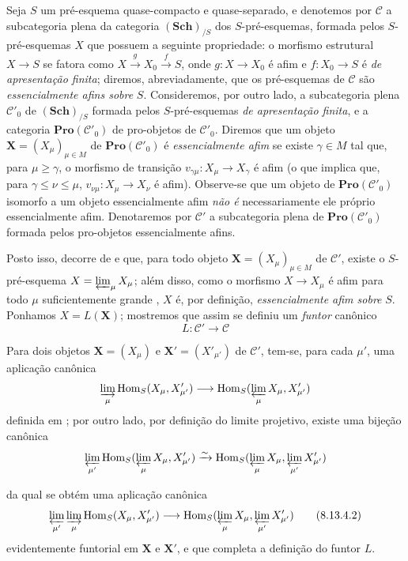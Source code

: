 \begin{env}[8.13.4]
\label{IV.8.13.4}
Seja $S$ um pré-esquema quase-compacto e quase-separado, e denotemos por $\mathcal{C}$ a subcategoria plena da categoria $(\mathbf{Sch})_{/S}$ dos $S$-pré-esquemas, formada pelos $S$-pré-esquemas $X$ que possuem a seguinte propriedade: o morfismo estrutural $X\to S$ se fatora como $X\xrightarrow{g}X_0\xrightarrow{f}S$, onde $g:X\to X_0$ é afim e $f:X_0\to S$ é \emph{de apresentação finita}; diremos, abreviadamente, que os pré-esquemas de $\mathcal{C}$ são \emph{essencialmente afins sobre} $S$.
Consideremos, por outro lado, a subcategoria plena $\mathcal{C}'_0$ de $(\mathbf{Sch})_{/S}$ formada pelos $S$-pré-esquemas \emph{de apresentação finita}, e a categoria $\mathbf{Pro}(\mathcal{C}'_0)$ de pro-objetos de $\mathcal{C}'_0$.
Diremos que um objeto $\mathbf{X}=(X_\mu)_{\mu\in M}$ de $\mathbf{Pro}(\mathcal{C}'_0)$ é \emph{essencialmente afim} se existe $\gamma\in M$ tal que, para $\mu\geqslant\gamma$, o morfismo de transição $v_{\gamma\mu}:X_\mu\to X_\gamma$ é afim (o que implica que, para $\gamma\leqslant\nu\leqslant\mu$, $v_{\nu\mu}:X_\mu\to X_\nu$ é afim).
Observe-se que um objeto de $\mathbf{Pro}(\mathcal{C}'_0)$ isomorfo a um objeto essencialmente afim \emph{não é} necessariamente ele próprio essencialmente afim.
Denotaremos por $\mathcal{C}'$ a subcategoria plena de $\mathbf{Pro}(\mathcal{C}'_0)$ formada pelos pro-objetos essencialmente afins.

Posto isso, decorre de  e  que, para todo objeto $\mathbf{X}=(X_\mu)_{\mu\in M}$ de $\mathcal{C}'$, existe o $S$-pré-esquema $X=\varprojlim_\mu X_\mu$; além disso, como o morfismo $X\to X_\mu$ é afim para todo $\mu$ suficientemente grande , $X$ é, por definição, \emph{essencialmente afim sobre} $S$.
Ponhamos $X=L(\mathbf{X})$; mostremos que assim se definiu um \emph{funtor} canônico
\begin{equation}
\label{IV.8.13.4.1}
L:\mathcal{C}'\to\mathcal{C} \tag{8.13.4.1}
\end{equation}

Para dois objetos $\mathbf{X}=(X_\mu)$ e $\mathbf{X}'=(X'_{\mu'})$ de $\mathcal{C}'$, tem-se, para cada $\mu'$, uma aplicação canônica
\[
\varinjlim_\mu\operatorname{Hom}_S(X_\mu,X'_{\mu'})\to\operatorname{Hom}_S(\varprojlim_\mu X_\mu,X'_{\mu'})
\]
definida em ; por outro lado, por definição do limite projetivo, existe uma bijeção canônica
\[
\varprojlim_{\mu'}\operatorname{Hom}_S(\varprojlim_\mu X_\mu,X'_{\mu'})\xrightarrow{\sim}\operatorname{Hom}_S(\varprojlim_\mu X_\mu,\varprojlim_{\mu'}X'_{\mu'})
\]

da qual se obtém uma aplicação canônica
\begin{equation}
\label{IV.8.13.4.2}
\varprojlim_{\mu'}\varinjlim_\mu\operatorname{Hom}_S(X_\mu,X'_{\mu'})\to\operatorname{Hom}_S(\varprojlim_\mu X_\mu,\varprojlim_{\mu'}X'_{\mu'}) \tag{8.13.4.2}
\end{equation}
evidentemente funtorial em $\mathbf{X}$ e $\mathbf{X}'$, e que completa a definição do funtor $L$.
\end{env}


